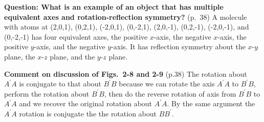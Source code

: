{\bf Question: What is an example of an object that has multiple equivalent axes and rotation-reflection symmetry?} (p.\ 38)
A molecule with atoms at (2,0,1), (0,2,1), (-2,0,1), (0,-2,1), (2,0,-1), (0,2,-1), (-2,0,-1), and (0,-2,-1) has four equivalent axes, the positive $x$-axis, the negative $x$-axis, the positive $y$-axis, and the negative $y$-axis. It has reflection symmetry about the $x$-$y$ plane, the $x$-$z$ plane, and the $y$-$z$ plane.

{\bf Comment on discussion of Figs.\ 2-8 and 2-9} (p.38) The rotation
about $A^\prime A$ is conjugate to that about $B^\prime B$ because we
can rotate the axis $A^\prime A$ to $B^\prime B$, perform the rotation
about $B^\prime B$, then do the reverse rotation of axis from
$B^\prime B$ to $A^\prime A$ and we recover the original rotation
about $A^\prime A$. By the same argument the $A^\prime A$ rotation is
conjugate the the rotation about $BB^\prime$.
